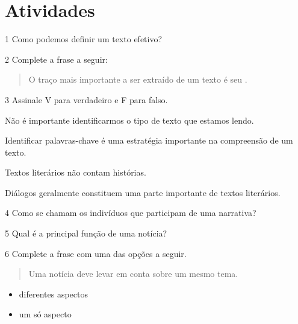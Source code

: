 \section{Atividades}

\num{1} Como podemos definir um texto efetivo?



\num{2} Complete a frase a seguir:

\begin{quote}
O traço mais importante a ser extraído de um texto é seu .
\end{quote}


\num{3} Assinale V para verdadeiro e F para falso.

\begin{boxlist}
 Não é importante identificarmos o tipo de texto que estamos lendo. 

 Identificar palavras-chave é uma estratégia importante na compreensão de um texto. 

 Textos literários não contam histórias. 

 Diálogos geralmente constituem uma parte importante de textos literários. 
\end{boxlist}

\num{4} Como se chamam os indivíduos que participam de uma narrativa?



\num{5} Qual é a principal função de uma notícia?



\num{6} Complete a frase com uma das opções a seguir.

\begin{quote}
Uma notícia deve levar em conta  sobre um mesmo tema.
\end{quote}

\begin{itemize}
	\item diferentes aspectos
	\item um só aspecto
\end{itemize}

